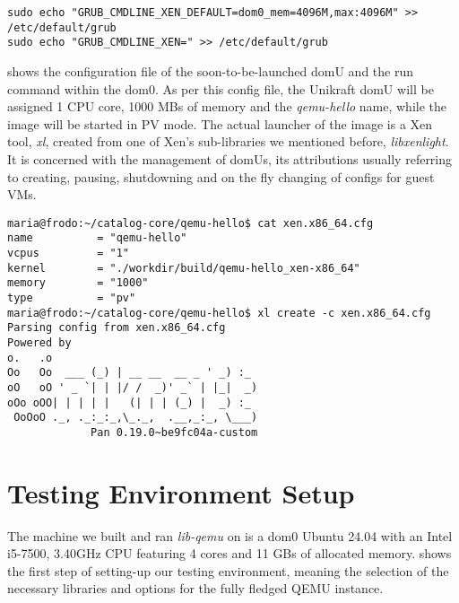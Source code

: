 \lstset{language=make,caption=GRUB options transforming a regular kernel into a Xen dom0,label=lst:grub-options}
\begin{lstlisting}
sudo echo "GRUB_CMDLINE_XEN_DEFAULT=dom0_mem=4096M,max:4096M" >> /etc/default/grub
sudo echo "GRUB_CMDLINE_XEN=" >> /etc/default/grub
\end{lstlisting}

 shows the configuration file of the soon-to-be-launched domU and the run command within the dom0.
As per this config file, the Unikraft domU will be assigned 1 CPU core, 1000 MBs of memory and the \textit{qemu-hello} name, while the image will be started in PV mode.
The actual launcher of the image is a Xen tool, \textit{xl}, created from one of Xen's sub-libraries we mentioned before, \textit{libxenlight}.
It is concerned with the management of domUs, its attributions usually referring to creating, pausing, shutdowning and on the fly changing of configs for guest VMs.

\lstset{language=make,caption=Running Unikraft command,label=lst:running-unikraft}
\begin{lstlisting}
maria@frodo:~/catalog-core/qemu-hello$ cat xen.x86_64.cfg 
name          = "qemu-hello"
vcpus         = "1"
kernel        = "./workdir/build/qemu-hello_xen-x86_64"
memory        = "1000"
type          = "pv"
maria@frodo:~/catalog-core/qemu-hello$ xl create -c xen.x86_64.cfg
Parsing config from xen.x86_64.cfg
Powered by
o.   .o
Oo   Oo  ___ (_) | __ __  __ _ ' _) :_
oO   oO ' _ `| | |/ /  _)' _` | |_|  _)
oOo oOO| | | | |   (| | | (_) |  _) :_
 OoOoO ._, ._:_:_,\_._,  .__,_:_, \___)
             Pan 0.19.0~be9fc04a-custom
\end{lstlisting}

\section{Testing Environment Setup}
\label{sec:testing-environment-setup}

The machine we built and ran \textit{lib-qemu} on is a dom0 Ubuntu 24.04 with an Intel i5-7500, 3.40GHz CPU featuring 4 cores and 11 GBs of allocated memory.
 shows the first step of setting-up our testing environment, meaning the selection of the necessary libraries and options for the fully fledged QEMU instance.


